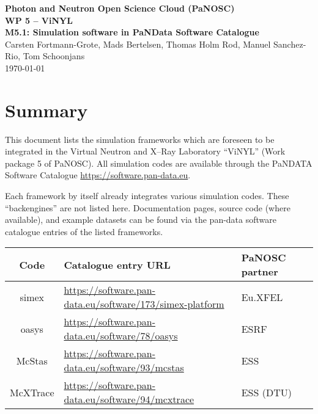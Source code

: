 \documentclass[10pt]{scrartcl}
\begin{document}
\makeatletter
\begin{titlepage}
\thispagestyle{scrheadings}
\begin{center}
  $~$\\
  \vspace{2cm}
  \Huge{%
    \textbf{%
      Photon and Neutron Open Science Cloud (PaNOSC) \\[1cm]
      WP 5 -- ViNYL\\[1cm]
      M5.1: Simulation software in PaNData Software Catalogue
    }
  }\\
  \vspace{2cm}
  \large{%
    Carsten Fortmann-Grote,
    Mads Bertelsen,
    Thomas Holm Rod,
    Manuel Sanchez-Rio,
    Tom Schoonjans
  }\\
  \today
\end{center}
\vfill%
\end{titlepage}
\makeatother


\section{Summary}

This document lists the simulation frameworks which are foreseen to be integrated in
the Virtual Neutron and X--Ray Laboratory ``ViNYL'' (Work package 5 of PaNOSC).
All simulation codes are available through the PaNDATA Software Catalogue
\url{https://software.pan-data.eu}.

Each framework by itself already integrates various simulation codes. These
``backengines'' are not listed here. Documentation pages, source code (where
available), and example datasets can be found via the pan-data software
catalogue entries of the listed frameworks.\\[5ex]
\begin{tabular}{|c|l|l|l|}
  \hline
  \textbf{Code} & \textbf{Catalogue entry URL} & \textbf{PaNOSC partner} \\
  \hline
  simex & \url{https://software.pan-data.eu/software/173/simex-platform} & Eu.XFEL \\
  oasys & \url{https://software.pan-data.eu/software/78/oasys} & ESRF \\
  McStas & \url{https://software.pan-data.eu/software/93/mcstas} & ESS \\
  McXTrace & \url{https://software.pan-data.eu/software/94/mcxtrace} & ESS (DTU) \\
  \hline
\end{tabular}
\end{document}
